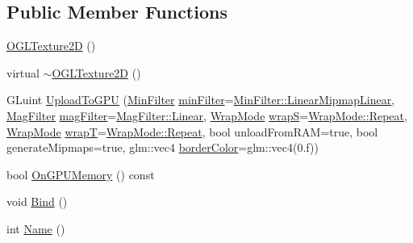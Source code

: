 \subsection*{Public Member Functions}
\begin{DoxyCompactItemize}
\item 
\hyperlink{class_o_g_l_texture2_d_a5f3587a49e018d390c9474e89d9ae15e}{O\+G\+L\+Texture2\+D} ()
\item 
virtual \hyperlink{class_o_g_l_texture2_d_a2e6d4cd96428f3f85485f9d1fd311c80}{$\sim$\+O\+G\+L\+Texture2\+D} ()
\item 
G\+Luint \hyperlink{class_o_g_l_texture2_d_aceb3c2fe81ee4137fbf412def59c449e}{Upload\+To\+G\+P\+U} (\hyperlink{class_o_g_l_texture2_d_a853053ed9bf1c5e1024f947303cb0ec3}{Min\+Filter} \hyperlink{class_o_g_l_texture2_d_a064aa8eb5f6a5bc10300c0a68fd95c10}{min\+Filter}=\hyperlink{class_o_g_l_texture2_d_a853053ed9bf1c5e1024f947303cb0ec3a1173bd3987b1e185d86b9c3fe1b8bd72}{Min\+Filter\+::\+Linear\+Mipmap\+Linear}, \hyperlink{class_o_g_l_texture2_d_ad72001307eaec4898b25c749c1857f25}{Mag\+Filter} \hyperlink{class_o_g_l_texture2_d_abcc4f2fdc77667a1ff83d0f23b94fbdd}{mag\+Filter}=\hyperlink{class_o_g_l_texture2_d_ad72001307eaec4898b25c749c1857f25a32a843da6ea40ab3b17a3421ccdf671b}{Mag\+Filter\+::\+Linear}, \hyperlink{class_o_g_l_texture2_d_ac6dae14737ed8643d30026dceebd10cc}{Wrap\+Mode} \hyperlink{class_o_g_l_texture2_d_a9ce6cda4bc4c3149447c20017c35efd8}{wrap\+S}=\hyperlink{class_o_g_l_texture2_d_ac6dae14737ed8643d30026dceebd10cca7020426cfb0a204051be4b3053d2acc8}{Wrap\+Mode\+::\+Repeat}, \hyperlink{class_o_g_l_texture2_d_ac6dae14737ed8643d30026dceebd10cc}{Wrap\+Mode} \hyperlink{class_o_g_l_texture2_d_a66d477be8c69a34eb6dc5660926bf28f}{wrap\+T}=\hyperlink{class_o_g_l_texture2_d_ac6dae14737ed8643d30026dceebd10cca7020426cfb0a204051be4b3053d2acc8}{Wrap\+Mode\+::\+Repeat}, bool unload\+From\+R\+A\+M=true, bool generate\+Mipmaps=true, glm\+::vec4 \hyperlink{class_o_g_l_texture2_d_ab49fd4b19ab6b299d99c128b90861e9d}{border\+Color}=glm\+::vec4(0.f))
\item 
bool \hyperlink{class_o_g_l_texture2_d_aaae8e4366b6a604aefe29a084c829b40}{On\+G\+P\+U\+Memory} () const 
\item 
void \hyperlink{class_o_g_l_texture2_d_a847cee596365faa58b86887a24384402}{Bind} ()
\item 
int \hyperlink{class_o_g_l_texture2_d_a565bb9c1091b837eb319f90dd47bae8d}{Name} ()
\end{DoxyCompactItemize}
